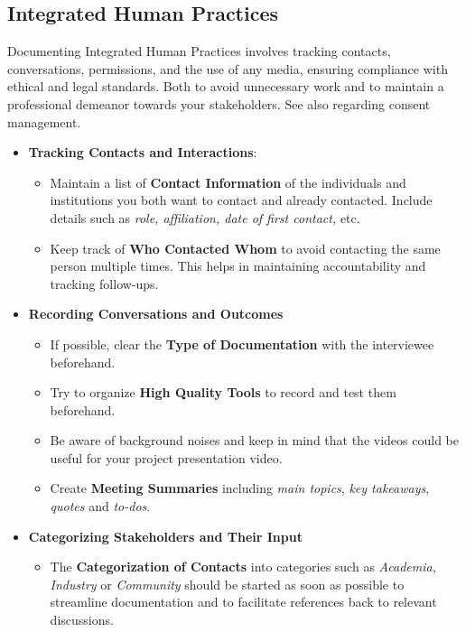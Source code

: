 \subsection{Integrated Human Practices} \label{subsec:ihp}  
Documenting Integrated Human Practices involves tracking contacts, conversations, permissions, and the use of any media, ensuring compliance with ethical and legal standards. \newline
Both to avoid unnecessary work and to maintain a professional demeanor towards your stakeholders.
See also
 regarding consent management.
\begin{itemize}
    \item \textbf{Tracking Contacts and Interactions}:
    \begin{itemize}
        \item Maintain a list of \textbf{Contact Information} of the individuals and institutions you both want to contact and already contacted.
        Include details such as \textit{role, affiliation, date of first contact,} etc.
        \item Keep track of \textbf{Who Contacted Whom} to avoid contacting the same person multiple times.
        This helps in maintaining accountability and tracking follow-ups.
    \end{itemize}
    \item \textbf{Recording Conversations and Outcomes }
    \begin{itemize}
        \item If possible, clear the \textbf{Type of Documentation} with the interviewee beforehand.
        \item Try to organize \textbf{High Quality Tools} to record and test them beforehand.
        \item Be aware of background noises and keep in mind that the videos could be useful for your project presentation video.
        \item Create \textbf{Meeting Summaries} including \textit{main topics}, \textit{key takeaways}, \textit{quotes} and \textit{to-dos}.
    \end{itemize}
    \item \textbf{Categorizing Stakeholders and Their Input}
    \begin{itemize} 
    \item The \textbf{Categorization of Contacts} into categories such as \textit{Academia, Industry} or \textit{Community} should be started as soon as possible to streamline documentation and to facilitate references back to relevant discussions.

\end{itemize}
\end{itemize}

